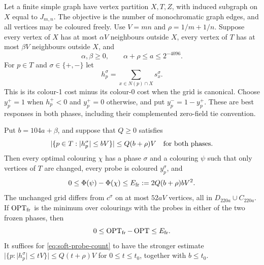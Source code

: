 \begin{proposition}
\label{prop:freezing}
Let a finite simple graph have vertex partition $X,T,Z$, with induced
subgraph on $X$ equal to $J_{m,n}$.  The objective is the number of
monochromatic graph edges, and all vertices may be coloured freely.
Use $V=mn$ and $\rho=1/m+1/n$.  Suppose every vertex of $X$ has at most
$\alpha V$ neighbours outside $X$, every vertex of $T$ has at most
$\beta V$ neighbours outside $X$, and
\[
 \alpha,\beta\ge0,\qquad \alpha+\rho\le a\le2^{-4096}.
\]
For $p\in T$ and $\sigma\in\{+,-\}$ let
\[
 h_p^\sigma=\sum_{x\in N(p)\cap X}s_x^\sigma.
\]
This is its colour-1 cost minus its colour-0 cost when the grid is
canonical.  Choose $y_p^+=1$ when $h_p^+<0$ and $y_p^+=0$ otherwise,
and put $y_p^-=1-y_p^+$.  These are best responses in both phases,
including their complemented zero-field tie convention.

Put $b=104a+\beta$, and suppose that $Q\ge0$ satisfies
\begin{equation}
 |\{p\in T:|h_p^\sigma|\le bV\}|
 \le Q(b+\rho)V
 \quad\hbox{for both phases}.
 \label{eq:soft-probe-count}
\end{equation}
Then every optimal colouring $\chi$ has a phase $\sigma$ and a colouring
$\psi$ such that only vertices of $T$ are changed, every probe is coloured
$y_p^\sigma$, and
\begin{equation}
 0\le\Phi(\psi)-\Phi(\chi)
 \le E_{\rm fr}:=2Q(b+\rho)bV^2.
 \label{eq:freezing-error}
\end{equation}
The unchanged grid differs from $c^\sigma$ on at most $52aV$ vertices,
all in $D_{220a}\cup C_{220a}$.  If $\operatorname{OPT}_{\rm fr}$ is the minimum over
colourings with the probes in either of the two frozen phases, then
\[
 0\le\operatorname{OPT}_{\rm fr}-\operatorname{OPT}\le E_{\rm fr}.
\]
It suffices for \eqref{eq:soft-probe-count} to have the stronger estimate
$|\{p:|h_p^\sigma|\le tV\}|\le Q(t+\rho)V$ for
$0\le t\le t_0$, together with $b\le t_0$.
\end{proposition}

